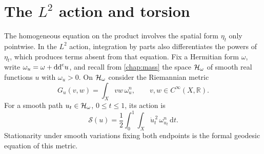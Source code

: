 \section{The \texorpdfstring{$L^2$}{L2} action and torsion}

The homogeneous equation on the product involves the spatial form $\eta_t$ only pointwise. In the $L^2$ action, integration by parts also differentiates the powers of $\eta_t$, which produces terms absent from that equation. Fix a Hermitian form $\omega$, write $\omega_u=\omega+\mathrm{dd}^{\mathrm{c}} u$, and recall from \cref{chap:mass} the space $\mathcal H_\omega$ of smooth real functions $u$ with $\omega_u>0$. On $\mathcal H_\omega$ consider the Riemannian metric
\[
 G_u(v,w)=\int_Xvw\,\omega_u^n,
 \qquad v,w\in C^\infty(X,\mathbb R).
\]
For a smooth path $u_t\in\mathcal H_\omega$, $0\leq t\leq1$, its action is
\[
 \mathscr S(u)=\frac12\int_0^1\int_X\dot u_t^{\,2}\,\omega_{u_t}^n\,\mathrm{d}t.
\]
Stationarity under smooth variations fixing both endpoints is the formal geodesic equation of this metric.

